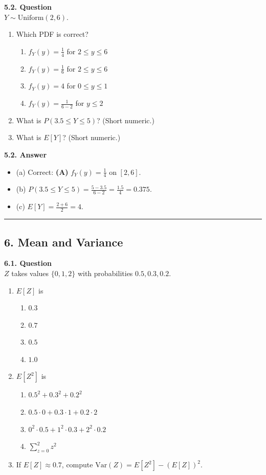 \documentclass[12pt]{article}
\begin{document}
\textbf{5.2. Question}\\
$Y\sim \mathrm{Uniform}(2,6).$
\begin{enumerate}[label=(\alph*)]
\item Which PDF is correct?
  \begin{enumerate}[label=\Alph*.]
  \item $f_Y(y)=\tfrac{1}{4}$ for $2\le y\le 6$
  \item $f_Y(y)=\tfrac{1}{6}$ for $2\le y\le 6$
  \item $f_Y(y)=4$ for $0\le y\le 1$
  \item $f_Y(y)=\tfrac{1}{6-2}$ for $y\le2$
  \end{enumerate}
\item What is $P(3.5 \le Y \le 5)$? (Short numeric.)
\item What is $E[Y]$? (Short numeric.)
\end{enumerate}

\noindent
\textbf{5.2. Answer}
\begin{itemize}
\item (a) Correct: \textbf{(A)} $f_Y(y)=\frac{1}{4}$ on $[2,6].$
\item (b) $P(3.5\le Y\le 5)=\frac{5-3.5}{6-2}=\frac{1.5}{4}=0.375.$
\item (c) $E[Y]=\frac{2+6}{2}=4.$
\end{itemize}

\hrule

\subsection*{6. Mean and Variance}

\textbf{6.1. Question}\\
$Z$ takes values $\{0,1,2\}$ with probabilities $0.5,0.3,0.2.$
\begin{enumerate}[label=(\alph*)]
\item $E[Z]$ is
  \begin{enumerate}[label=\Alph*.]
  \item $0.3$
  \item $0.7$
  \item $0.5$
  \item $1.0$
  \end{enumerate}
\item $E[Z^2]$ is
  \begin{enumerate}[label=\Alph*.]
  \item $0.5^2 + 0.3^2 + 0.2^2$
  \item $0.5\cdot0 + 0.3\cdot1 + 0.2\cdot2$
  \item $0^2\cdot0.5 + 1^2\cdot0.3 + 2^2\cdot0.2$
  \item $\sum_{z=0}^2 z^2$
  \end{enumerate}
\item If $E[Z]\approx0.7$, compute $\mathrm{Var}(Z)=E[Z^2]- (E[Z])^2.$
\end{enumerate}
\end{document}
